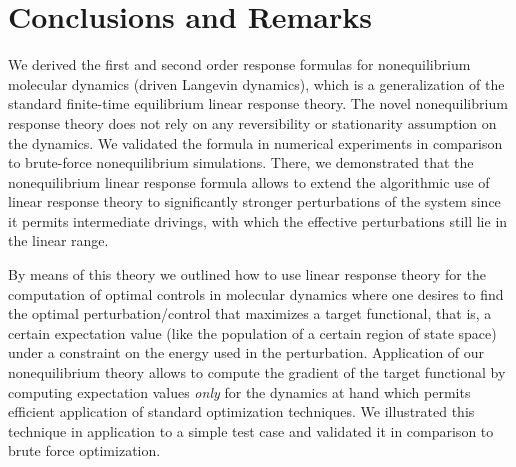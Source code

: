 \documentclass[]{tMPH2e}
\newcommand{\recheck}[1]{{\color{red} #1}}
\begin{document}
 





\section{Conclusions and Remarks}


\recheck{
  We derived the first and second order
  response formulas for nonequilibrium molecular
dynamics (driven Langevin dynamics), which is a generalization of the
standard finite-time equilibrium linear response theory.
The novel nonequilibrium response theory
does not rely on any reversibility or stationarity assumption on the dynamics.
We validated the formula in numerical
experiments in comparison to brute-force nonequilibrium
simulations. There, we demonstrated that the nonequilibrium linear
response formula allows to extend the algorithmic use of linear
response theory to significantly stronger perturbations of the system
since it permits intermediate drivings, with which the effective perturbations
still lie in the linear range.
}

By means of this theory we outlined how to use linear response theory for the computation of optimal controls in molecular dynamics where one desires to find the optimal perturbation/control that maximizes a target functional, that is, a certain expectation value (like the population of a certain region of state space) under a constraint on the energy used in the perturbation. Application of our nonequilibrium theory allows to compute the gradient of the target functional by computing expectation values \emph{only} for the dynamics at hand which permits efficient application of standard optimization techniques. We illustrated this technique in application to a simple test case and validated it in comparison to brute force optimization.  













\end{document}
